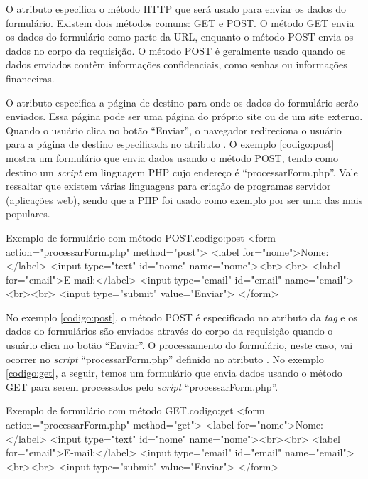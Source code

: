 O atributo  especifica o método HTTP que será usado para enviar os dados do formulário. Existem dois métodos comuns: GET e POST. O método GET envia os dados do formulário como parte da URL, enquanto o método POST envia os dados no corpo da requisição. O método POST é geralmente usado quando os dados enviados contêm informações confidenciais, como senhas ou informações financeiras.

O atributo  especifica a página de destino para onde os dados do formulário serão enviados. Essa página pode ser uma página do próprio site ou de um site externo. Quando o usuário clica no botão ``Enviar'', o navegador redireciona o usuário para a página de destino especificada no atributo . O exemplo \ref{codigo:post} mostra um formulário que envia dados usando o método POST, tendo como destino um \textit{script} em linguagem PHP cujo endereço é ``processarForm.php''. Vale ressaltar que existem várias linguagens para criação de programas servidor (aplicações web), sendo que a PHP foi usado como exemplo por ser uma das mais populares.

\begin{htmlcode}{Exemplo de formulário com método POST.}{codigo:post}
<form action="processarForm.php" method="post">
   <label for="nome">Nome:</label>
   <input type="text" id="nome" name="nome"><br><br>
<label for="email">E-mail:</label>
<input type="email" id="email" name="email"><br><br>
   <input type="submit" value="Enviar">
</form>
\end{htmlcode}

No exemplo \ref{codigo:post}, o método POST é especificado no atributo  da \textit{tag}  e os dados do formulários são enviados através do corpo da requisição quando o usuário clica no botão ``Enviar''. O processamento do formulário, neste caso, vai ocorrer no \textit{script} ``processarForm.php'' definido no atributo . No exemplo \ref{codigo:get}, a seguir, temos um formulário que envia dados usando o método GET para serem processados pelo \textit{script} ``processarForm.php''.

\begin{htmlcode}{Exemplo de formulário com método GET.}{codigo:get}
<form action="processarForm.php" method="get">
   <label for="nome">Nome:</label>
   <input type="text" id="nome" name="nome"><br><br>
<label for="email">E-mail:</label>
<input type="email" id="email" name="email"><br><br>
   <input type="submit" value="Enviar">
</form>
\end{htmlcode}

